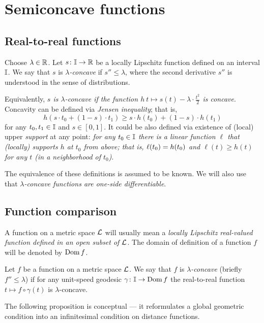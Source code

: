 \chapter{Semiconcave functions}

\section{Real-to-real functions}

Choose $\lambda\in \mathbb{R}$.
Let $s\colon\mathbb{I}\to\mathbb{R}$ be a locally Lipschitz function defined on an interval $\mathbb{I}$.
We say that $s$ is \emph{$\lambda$-concave} if $s''\le \lambda$, where the second derivative $s''$ is understood in the sense of distributions.

Equivalently, \textit{$s$ is $\lambda$-concave if the function $h\:t\mapsto s(t)-\lambda\cdot\tfrac{t^2}2$ is concave}.
Concavity can be defined via \emph{Jensen inequality}; that is,
\[h(s\cdot t_0+(1-s)\cdot t_1)\ge s\cdot h(t_0)+(1-s)\cdot h(t_1)\]
for any $t_0,t_1\in \mathbb{I}$ and $s\in[0,1]$.
It could be also defined via existence of (local) upper \emph{support} at any point:
\textit{for any $t_0\in \mathbb{I}$ there is a linear function $\ell$ that (locally) supports $h$ at $t_0$ from above;
that is, $\ell(t_0)\z= h(t_0)$ and $\ell(t)\ge h(t)$ for any $t$ (in a neighborhood of $t_0$)}.

The equivalence of these definitions is assumed to be known.
We will also use that \textit{$\lambda$-concave functions are one-side differentiable}.


\section{Function comparison}

A function on a metric space $\mathcal{L}$ will usually mean a \textit{locally Lipschitz real-valued function defined in an open subset of $\mathcal{L}$}.
The domain of definition of a function $f$ will be denoted by $\mathop{\rm Dom}\nolimits f$.


Let $f$ be a function on a metric space $\mathcal{L}$.
We say that $f$ is \emph{$\lambda$-concave} (briefly $f''\le \lambda$) if 
for any unit-speed geodesic $\gamma\:\II\z\to \Dom f$
the real-to-real function $t\mapsto f\circ\gamma(t)$ is $\lambda$-concave.

The following proposition is conceptual ---
it reformulates a global geometric condition into an infinitesimal condition on distance functions.


